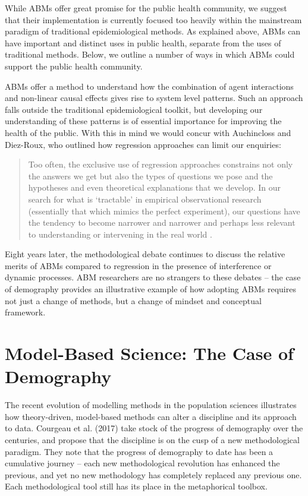 \documentclass[review]{elsarticle}
\begin{document}
While ABMs offer great promise for the public health community, we suggest that their implementation is currently focused too heavily within the mainstream paradigm of traditional epidemiological methods. As explained above, ABMs can have important and distinct uses in public health, separate from the uses of traditional methods. Below, we outline a number of ways in which ABMs could support the public health community.

ABMs offer a method to understand how the combination of agent interactions and non-linear causal effects gives rise to system level patterns. Such an approach falls outside the traditional epidemiological toolkit, but developing our understanding of these patterns is of essential importance for improving the health of the public. With this in mind we would concur with Auchincloss and Diez-Roux, who outlined how regression approaches can limit our enquiries:

\begin{quote}
Too often, the exclusive use of regression approaches constrains not only the answers we get but also the types of questions we pose and the hypotheses and even theoretical explanations that we develop. In our search for what is `tractable' in empirical observational research (essentially that which mimics the perfect experiment), our questions have the tendency to become narrower and narrower and perhaps less relevant to understanding or intervening in the real world \citep[][p. 6]{auchincloss2008}.
\end{quote}

Eight years later, the methodological debate continues to discuss the relative merits of ABMs compared to regression in the presence of interference or dynamic processes.  ABM researchers are no strangers to these debates -- the case of demography provides an illustrative example of how adopting ABMs requires not just a change of methods, but a change of mindset and conceptual framework.

\section{Model-Based Science: The Case of Demography}

The recent evolution of modelling methods in the population sciences illustrates how theory-driven, model-based methods can alter a discipline and its approach to data.  Courgeau et al. (2017) take stock of the progress of demography over the centuries, and propose that the discipline is on the cusp of a new methodological paradigm.  They note that the progress of demography to date has been a cumulative journey -- each new methodological revolution has enhanced the previous, and yet no new methodology has completely replaced any previous one.  Each methodological tool still has its place in the metaphorical toolbox. 
\end{document}
